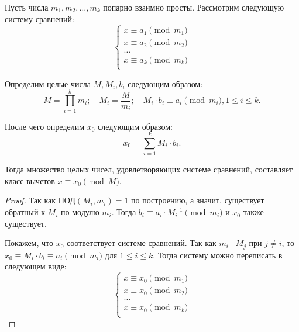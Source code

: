 \documentclass[a4paper]{article}
\theoremstyle{named}
\renewcommand{\gcd}{\text{НОД}}
\begin{document}
\begin{colloq}
        \begin{theorem*}
            Пусть числа $m_1, m_2, \dots, m_k$ попарно взаимно просты. Рассмотрим следующую систему сравнений:
            \begin{equation*}
                \begin{cases}
                    x \equiv a_1 \pmod{m_1} \\
                    x \equiv a_2 \pmod{m_2} \\
                    \dots \\
                    x \equiv a_k \pmod{m_k} \\
                \end{cases}
            \end{equation*}

            Определим целые числа $M, M_i, b_i$ следующим образом:
            \begin{equation*}
                M = \prod_{i = 1}^k m_i; \quad
                M_i = \dfrac{M}{m_i}; \quad
                M_i \cdot b_i \equiv a_i \pmod{m_i}, 1 \leq i \leq k.
            \end{equation*}

            После чего определим $x_0$ следующим образом:
            \begin{equation*}
                x_0 = \sum_{i = 1}^k M_i \cdot b_i.
            \end{equation*}

            Тогда множество целых чисел, удовлетворяющих системе сравнений, составляет класс вычетов $x \equiv x_0 \pmod M$.
        \end{theorem*}

        \begin{proof}
            Так как $\gcd(M_i, m_i) = 1$ по построению, а значит, существует обратный к $M_i$ по модулю $m_i$. Тогда $b_i \equiv a_i \cdot M_i^{-1} \pmod{m_i}$ и $x_0$ также существует.

            Покажем, что $x_0$ соответствует системе сравнений. Так как $m_i \mid M_j$ при $j \neq i$, то $x_0 \equiv M_i \cdot b_i \equiv a_i \pmod{m_i}$ для $1 \leq i \leq k$. Тогда систему можно переписать в следующем виде:
            \begin{equation*}
                 \begin{cases}
                    x \equiv x_0 \pmod{m_1} \\
                    x \equiv x_0 \pmod{m_2} \\
                    \dots \\
                    x \equiv x_0 \pmod{m_k} \\
                \end{cases}
            \end{equation*}


\end{proof}
\end{colloq}
\end{document}
